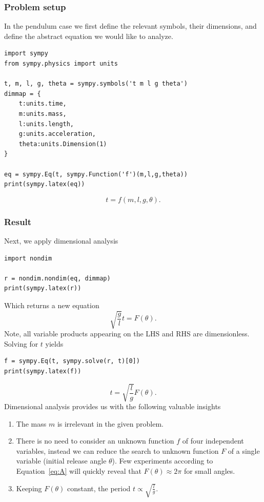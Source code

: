 \documentclass[11pt]{article}
\begin{document}
\subsubsection{Problem setup}
In the pendulum case we first define the relevant symbols, their dimensions, and define the abstract equation we would like to analyze.
\begin{verbatim}
import sympy
from sympy.physics import units

t, m, l, g, theta = sympy.symbols('t m l g theta')
dimmap = {
    t:units.time, 
    m:units.mass, 
    l:units.length, 
    g:units.acceleration, 
    theta:units.Dimension(1)
}

eq = sympy.Eq(t, sympy.Function('f')(m,l,g,theta))
print(sympy.latex(eq))
\end{verbatim}
$$t = f{\left(m,l,g,\theta \right)}.$$

\subsubsection{Result}
Next, we apply dimensional analysis
\begin{verbatim}
import nondim

r = nondim.nondim(eq, dimmap)
print(sympy.latex(r))
\end{verbatim}
Which returns a new equation
\begin{equation}
    \sqrt{\frac{g}{l}}t = F{\left(\theta \right)}. \label{eq:A}
\end{equation} Note, all variable products appearing on the LHS and RHS are dimensionless. Solving for $t$ yields
\begin{verbatim}
f = sympy.Eq(t, sympy.solve(r, t)[0])
print(sympy.latex(f))
\end{verbatim}
$$t = \sqrt{\frac{l}{g}}F{\left(\theta \right)}.$$ 
Dimensional analysis provides us with the following valuable insights
\begin{enumerate}
    \item The mass $m$ is irrelevant in the given problem.
    \item There is no need to consider an unknown function $f$ of four independent variables, instead we can reduce the search to unknown function $F$ of a single variable (initial release angle $\theta$). Few experiments according to Equation~\ref{eq:A} will quickly reveal that $F(\theta)\approx 2\pi$ for small angles.
    \item Keeping $F{\left(\theta \right)}$ constant, the period $t \propto  \sqrt{\frac{l}{g}}$.
\end{enumerate}
\end{document}
